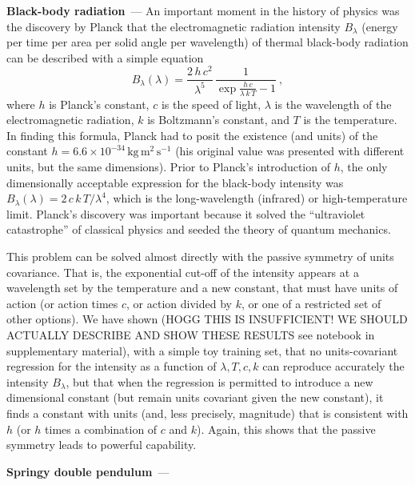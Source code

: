 \documentclass[11pt]{article}
\newcommand{\unit}[1]{\mathrm{#1}}
\newcommand{\kg}{\unit{kg}}
\newcommand{\m}{\unit{m}}
\newcommand{\s}{\unit{s}}
\renewcommand{\paragraph}[1]{\medskip\par\noindent\textbf{#1}~---}
\begin{document}
\paragraph{Black-body radiation}
An important moment in the history of physics was the discovery by Planck that the electromagnetic radiation intensity $B_\lambda$ (energy per time per area per solid angle per wavelength) of thermal black-body radiation can be described with a simple equation \cite{planck}
\begin{equation}
    B_\lambda(\lambda) = \frac{2\,h\,c^2}{\lambda^5}\,\frac{1}{\exp\frac{h\,c}{\lambda\,k\,T} - 1}~,
\end{equation}
where $h$ is Planck's constant,
$c$ is the speed of light,
$\lambda$ is the wavelength of the electromagnetic radiation,
$k$ is Boltzmann's constant,
and $T$ is the temperature.
In finding this formula, Planck had to posit the existence (and units) of the constant $h=6.6\times 10^{-34}\,\kg\,\m^2\,\s^{-1}$ (his original value was presented with different units, but the same dimensions).
Prior to Planck's introduction of $h$, the only dimensionally acceptable expression for the black-body intensity was $B_\lambda(\lambda)=2\,c\,k\,T/\lambda^4$, which is the long-wavelength (infrared) or high-temperature limit.
Planck's discovery was important because it solved the ``ultraviolet catastrophe'' of classical physics and seeded the theory of quantum mechanics.

This problem can be solved almost directly with the passive symmetry of units covariance.
That is, the exponential cut-off of the intensity appears at a wavelength set by the temperature and a new constant, that must have units of action (or action times $c$, or action divided by $k$, or one of a restricted set of other options).
We have shown (HOGG THIS IS INSUFFICIENT! WE SHOULD ACTUALLY DESCRIBE AND SHOW THESE RESULTS see notebook in supplementary material), with a simple toy training set, that no units-covariant regression for the intensity as a function of $\lambda, T, c, k$ can reproduce accurately the intensity $B_\lambda$, but that when the regression is permitted to introduce a new dimensional constant (but remain units covariant given the new constant), it finds a constant with units (and, less precisely, magnitude) that is consistent with $h$ (or $h$ times a combination of $c$ and $k$).
Again, this shows that the passive symmetry leads to powerful capability.

\paragraph{Springy double pendulum}
\end{document}
